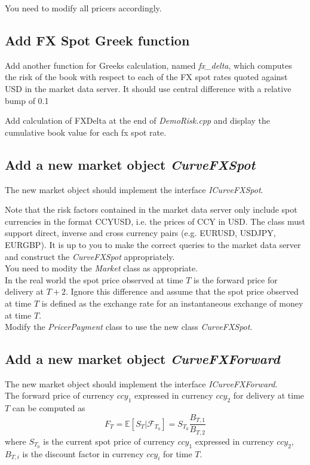 \documentclass[10pt]{article}
\begin{document}
You need to modify all pricers accordingly.

\subsection{Add FX Spot Greek function}
\label{sec:fxdelta}
Add another function for Greeks calculation, named \textit{fx\_delta}, which computes the risk of the book with respect to each of the FX spot rates quoted against USD in the market data server. It should use central difference with a relative bump of 0.1%

Add calculation of FXDelta at the end of \textit{DemoRisk.cpp} and display the cumulative book value for each fx spot rate.


\subsection{Add a new market object \textit{CurveFXSpot}}
The new market object should implement the interface \textit{ICurveFXSpot}.

Note that the risk factors contained in the market data server only include spot currencies in the format CCYUSD, i.e. the prices of CCY in USD. The class must support direct, inverse and cross currency pairs (e.g. EURUSD, USDJPY, EURGBP). It is up to you to make the correct queries to the market data server and construct the \textit{CurveFXSpot} appropriately.\\

You need to modity the \textit{Market} class as appropriate.\\

In the real world the spot price observed at time $T$ is the forward price for delivery at $T+2$. Ignore this difference and assume that the spot price observed at time $T$ is defined as the exchange rate for an instantaneous exchange of money at time $T$.\\

Modify the \textit{PricerPayment} class to use the new class \textit{CurveFXSpot}.

\subsection{Add a new market object \textit{CurveFXForward}}
The new market object should implement the interface \textit{ICurveFXForward}.\\

The forward price of currency $ccy_1$ expressed in currency $ccy_2$ for delivery at time $T$ can be computed as
$$F_T=\mathbb{E}[S_T|\mathcal{F}_{T_0}]=S_{T_0} \frac{B_{T,1}}{B_{T,2}}$$
where $S_{T_0}$ is the current spot price of currency $ccy_1$ expressed in currency $ccy_2$, $B_{T,i}$ is the discount factor in currency $ccy_i$ for time $T$.\\
\end{document}
